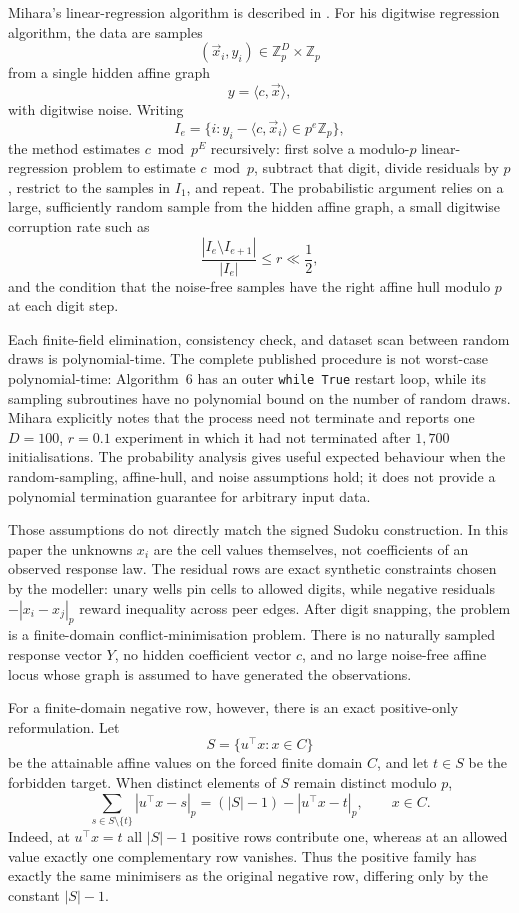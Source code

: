 \documentclass[11pt]{article}
\begin{document}
Mihara's linear-regression algorithm is described in \cite{mihara2026digitwise}. For his digitwise regression algorithm, the data are samples
\[
(\vec x_i,y_i)\in\mathbb Z_p^D\times\mathbb Z_p
\]
from a single hidden affine graph
\[
y=\langle c,\vec x\rangle,
\]
with digitwise noise. Writing
\[
I_e=\{i:y_i-\langle c,\vec x_i\rangle\in p^e\mathbb Z_p\},
\]
the method estimates \(c\bmod p^E\) recursively: first solve a modulo-\(p\) linear-regression problem to estimate \(c\bmod p\), subtract that digit, divide residuals by \(p\), restrict to the samples in \(I_1\), and repeat. The probabilistic argument relies on a large, sufficiently random sample from the hidden affine graph, a small digitwise corruption rate such as
\[
\frac{|I_e\setminus I_{e+1}|}{|I_e|}\le r \ll \frac12,
\]
and the condition that the noise-free samples have the right affine hull modulo \(p\) at each digit step.

Each finite-field elimination, consistency check, and dataset scan between random draws is polynomial-time. The complete published procedure is not worst-case polynomial-time: Algorithm~6 has an outer \texttt{while True} restart loop, while its sampling subroutines have no polynomial bound on the number of random draws. Mihara explicitly notes that the process need not terminate and reports one \(D=100\), \(r=0.1\) experiment in which it had not terminated after \(1{,}700\) initialisations. The probability analysis gives useful expected behaviour when the random-sampling, affine-hull, and noise assumptions hold; it does not provide a polynomial termination guarantee for arbitrary input data.

Those assumptions do not directly match the signed Sudoku construction. In this paper the unknowns \(x_i\) are the cell values themselves, not coefficients of an observed response law. The residual rows are exact synthetic constraints chosen by the modeller: unary wells pin cells to allowed digits, while negative residuals \(-|x_i-x_j|_p\) reward inequality across peer edges. After digit snapping, the problem is a finite-domain conflict-minimisation problem. There is no naturally sampled response vector \(Y\), no hidden coefficient vector \(c\), and no large noise-free affine locus whose graph is assumed to have generated the observations.

For a finite-domain negative row, however, there is an exact positive-only reformulation. Let
\[
S=\{u^\top x:x\in C\}
\]
be the attainable affine values on the forced finite domain \(C\), and let \(t\in S\) be the forbidden target. When distinct elements of \(S\) remain distinct modulo \(p\),
\[
\sum_{s\in S\setminus\{t\}} |u^\top x-s|_p
= (|S|-1)-|u^\top x-t|_p,
\qquad x\in C.
\]
Indeed, at \(u^\top x=t\) all \(|S|-1\) positive rows contribute one, whereas at an allowed value exactly one complementary row vanishes. Thus the positive family has exactly the same minimisers as the original negative row, differing only by the constant \(|S|-1\).
\end{document}
